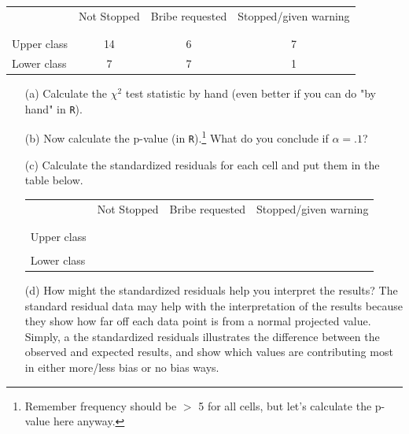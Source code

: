 \documentclass[12pt,letterpaper]{article}
\begin{document}
\newpage
\begin{table}[h!]
	\centering
	\begin{tabular}{l | c c c }
		& Not Stopped & Bribe requested & Stopped/given warning \\
		\\[-1.8ex] 
		\hline \\[-1.8ex]
		Upper class & 14 & 6 & 7 \\
		Lower class & 7 & 7 & 1 \\
		\hline
	\end{tabular}
\end{table}

\begin{enumerate}
	
	\item [(a)]
	Calculate the $\chi^2$ test statistic by hand (even better if you can do "by hand" in \texttt{R}).\\
	\vspace{7cm}
	 
	
	\item [(b)]
	Now calculate the p-value (in \texttt{R}).\footnote{Remember frequency should be $>$ 5 for all cells, but let's calculate the p-value here anyway.}  What do you conclude if $\alpha = .1$?\\
	 
	
	\newpage
	\item [(c)] Calculate the standardized residuals for each cell and put them in the table below.
	\vspace{1cm}
	 
	
	\begin{table}[h]
		\centering
		\begin{tabular}{l | c c c }
			& Not Stopped & Bribe requested & Stopped/given warning \\
			\\[-1.8ex] 
			\hline \\[-1.8ex]
			Upper class  &  &  &  \\
			\\
			Lower class &  &   &   \\
			
		\end{tabular}
	\end{table}
	
	
	\vspace{7cm}
	\item [(d)] How might the standardized residuals help you interpret the results?  
The standard residual data may help with the interpretation of the results because they show how far off each data point is from a normal projected value. Simply, a the standardized residuals illustrates the difference between the observed and expected results, and show which values are contributing most in either more/less bias or no bias ways.
	
	
\end{enumerate}
\newpage
\end{document}
